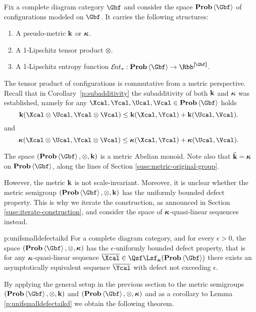   Fix a complete diagram category $\Gbf$ and consider the space $\prob\<\Gbf>$
  of configurations modeled on $\Gbf$. 
  It carries the following structures:
  \begin{enumerate}
  \item A pseudo-metric $\operatorname{\mathbf{k}}$ or $\operatorname{{\bm\kappa}}$.
  \item A 1-Lipschitz tensor product $\otimes$.
  \item A 1-Lipschitz entropy function
    $\ent_{*}:\prob\<\Gbf>\to\Rbb^{\size{\Gbf}}$.
  \end{enumerate}

  The tensor product of configurations is commutative from a metric
  perspective.  Recall that in Corollary~\ref{p:subadditivity} the
  subadditivity of both $\operatorname{\mathbf{k}}$ and $\operatorname{{\bm\kappa}}$ was established, namely for
  any $\Xcal, \Ycal, \Ucal, \Vcal \in \prob\<\Gbf>$ holds
  \[
  \ikd(\Xcal \otimes \Ucal, \Ycal \otimes \Vcal)
  \leq 
  \ikd(\Xcal, \Ycal) + \ikd( \Ucal, \Vcal ).
  \]	
  and 
  \[
  \aikd(\Xcal \otimes \Ucal, \Ycal \otimes \Vcal)
  \leq 
  \aikd(\Xcal, \Ycal) + \aikd( \Ucal, \Vcal ).
  \]

  The space $(\prob\<\Gbf>, \otimes, \ikd)$ is a metric Abelian
  monoid.  Note also that $\hat{\operatorname{\mathbf{k}}} = \operatorname{{\bm\kappa}}$ on $\prob\<\Gbf>$,
  along the lines of Section \ref{suse:metric-original-group}.
  
  However, the metric $\operatorname{\mathbf{k}}$ is not scale-invariant. Moreover, it is
  unclear whether the metric semigroup $(\prob\<\Gbf>, \otimes ,\ikd)$
  has the uniformly bounded defect property. This is why we iterate
  the construction, as announced in Section
  \ref{suse:iterate-construction}, and consider the space of
  $\operatorname{{\bm\kappa}}$-quasi-linear sequences instead.
  
  \begin{lemma}{p:unifsmalldefectaikd}
    For a complete diagram category, and for every $\epsilon > 0$, the
    space $(\prob\<\Gbf>,\otimes,\aikd)$ has the $\epsilon$-uniformly
    bounded defect property, that is for any $\operatorname{{\bm\kappa}}$-quasi-linear
    sequence $\bar\Xcal\in\qlin_{\aikd}(\prob\<\Gbf>)$ there exists an
    asymptotically equivalent sequence $\bar\Ycal$ with defect not
    exceeding $\epsilon$.
  \end{lemma}

  By applying the general setup in the previous section to the metric
  semigroups $(\prob\<\Gbf>, \otimes, \ikd)$ and $(\prob\<\Gbf>,
  \otimes, \aikd)$ and as a corollary to Lemma
  \ref{p:unifsmalldefectaikd} we obtain the following theorem.

